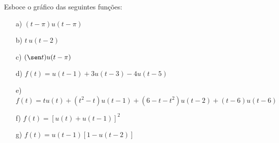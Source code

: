 \begin{exer}{\label{ex_Heaviside0}}Esboce o gráfico das seguintes funções:
\begin{itemize}
 \item [a)] $\displaystyle (t-\pi)u(t-\pi)$
 \item [b)] $\displaystyle t \ u(t-2)$
 \item [c)] $\displaystyle (\sen t) u(t-\pi)$
 \item [d)] $f(t)=u(t-1)+3u(t-3)-4u(t-5)$ 
 \item [e)] $f(t)=tu(t)+(t^2-t)u(t-1)+(6-t-t^2)u(t-2)+(t-6)u(t-6)$
 \item [f)] $f(t)=\left[u(t)+u(t-1)\right]^2$
 \item [g)] $f(t)=u(t-1)\left[1-u(t-2)\right] $
\end{itemize}
\end{exer}
